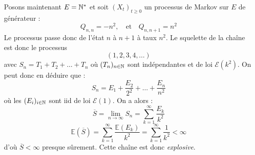 \begin{example}
\begin{center}
        \end{center}
\end{example}

\begin{example}
    Posons maintenant $ E = \mathbb{N}^*$ et soit $(X_t)_{t \geqslant 0}$ un processus de Markov sur $E$ 
    de générateur :  
        $$ Q_{n,n} = -n^2, \quad \text{et} \quad Q_{n, n+1} = n^2 $$ 
    Le processus passe donc de l'état $n$ à $n+1$ à taux $ n^2$. Le squelette de la chaîne est donc le processus 
        $$ (1,2,3,4, \dots) $$ 
    avec $S_n = T_1 + T_2 + \dots + T_n$ où $(T_n)_{n \in \mathbb{N}}$ sont indépendantes et de loi $ \mathcal{E}(k^2)$. On 
    peut donc en déduire que : 
        $$ S_n = E_1 + \frac{E_2}{2^2} + \dots + \frac{E_n}{n^2} $$ 
    où les $(E_i)_{i \in \mathbb{N}}$ sont iid de loi $ \mathcal{E}(1)$. On a alors : 
        $$ \overline{S} = \lim_{n \to \infty} S_n = \sum_{k=1}^{\infty} \frac{E_k}{k^2} $$ 
        $$ \mathbb{E}( \overline{S}) = \sum_{k=1}^{\infty} \frac{ \mathbb{E}(E_k) }{k^2} = \sum_{k=1}^{\infty} \frac{1}{k^2} < \infty $$ 
    d'où $ \overline{S} < \infty$ presque sûrement. Cette chaîne est donc \emph{explosive}. 
\end{example}

